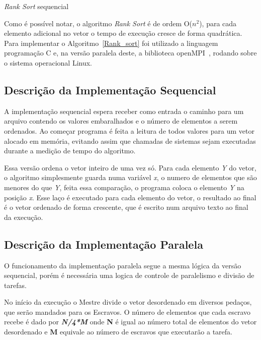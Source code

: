 \documentclass[portuguese, conference]{IEEEtran}
\begin{document}
\begin{algorithm}[]
\label{Rank_sort}
    
 \caption{{\it Rank Sort} sequencial}
\end{algorithm}

Como é possível notar, o algoritmo {\it Rank Sort} é de ordem O($n^{2}$), para cada elemento adicional no vetor o tempo de execução cresce de forma quadrática. Para implementar o Algoritmo~\ref{Rank_sort} foi utilizado a linguagem programação C e, na versão paralela deste, a biblioteca openMPI~\cite{HAM13}, rodando sobre o sistema operacional Linux.

\subsection{Descrição da Implementação Sequencial}
A implementação sequencial espera receber como entrada o caminho para um arquivo contendo os valores embaralhados e o número de elementos a serem ordenados. Ao começar programa é feita a leitura de todos valores para um vetor alocado em memória, evitando assim que chamadas de sistemas sejam executadas durante a medição de tempo do algoritmo.

Essa versão ordena o vetor inteiro de uma vez só. Para cada elemento \textit{Y} do vetor, o algoritmo simplesmente guarda numa variável \textit{x}, o numero de elementos que são menores do que \textit{Y}, feita essa comparação, o programa coloca o elemento \textit{Y} na posição \textit{x}. Esse laço é executado para cada elemento do vetor, o resultado ao final é o vetor ordenado de forma crescente, que é escrito num arquivo texto ao final da execução.

\subsection{Descrição da Implementação Paralela}

O funcionamento da implementação paralela segue a mesma lógica da versão sequencial, porém é necessária uma logica de controle de paralelismo e divisão de tarefas.

No início da execução o Mestre divide o vetor desordenado em diversos pedaços, que serão mandados para os Escravos. O número de elementos que cada escravo recebe é dado por \textit{\textbf{N/4*M}} onde \textbf{N} é igual ao número total de elementos do vetor desordenado e \textbf{M} equivale ao número de escravos que executarão a tarefa.
\end{document}
